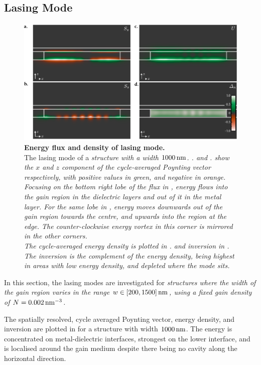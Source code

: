 
\subsection{Lasing Mode} \label{sec:lasingMode}

\begin{figure}
 \includegraphics{figs/sl/EnDensPV.pdf}
 \caption[Energy density and flux of lasing mode]{\label{fig:EnDensPV}
\textbf{Energy flux and density of lasing mode.}\small\\
The lasing mode of a \sl structure with a width $1000\operatorname{nm}$.
\subA. and \subB. show the $x$ and $z$ component of the cycle-averaged
Poynting vector respectively, with positive values in green, and negative in
orange.
Focusing on the bottom right lobe of the flux in \subA, energy flows into
the gain region in the dielectric layers and out of it in the metal layer.
For the same lobe in \subB, energy moves downwards out of the gain region
towards the centre, and upwards into the region at the edge.
The counter-clockwise energy vortex in this corner is mirrored in
the other corners.
\\
The cycle-averaged energy density is plotted in \subC. and inversion in
\subD.
The inversion is the complement of the energy density, being highest in areas
with low energy density, and depleted where the mode sits.
}
\end{figure}

In this section, the lasing modes are investigated for \sl structures where
the width of the gain region varies in the range $w \in [200, 1500]\operatorname{nm}$, using a
fixed gain density of $N=0.002\operatorname{nm}^{-3}$.

The spatially resolved, cycle averaged Poynting vector, energy density, and
inversion are plotted in  for a structure with width $1000\operatorname{nm}$.
The energy is concentrated on metal-dielectric interfaces, strongest on the
lower interface, and is localised around the gain medium despite there
being no cavity along the horizontal direction.

